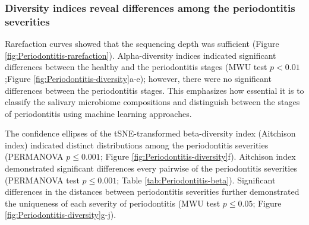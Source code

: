 \documentclass[11pt, a4paper, onecolumn, oneside]{report}
\begin{document}
            \subsubsection{Diversity indices reveal differences among the periodontitis severities}
                Rarefaction curves showed that the sequencing depth was sufficient (Figure \ref{fig:Periodontitis-rarefaction}). Alpha-diversity indices indicated significant differences between the healthy and the periodontitis stages (MWU test $p < 0.01$;Figure \ref{fig:Periodontitis-diversity}a-e); however, there were no significant differences between the periodontitis stages. This emphasizes how essential it is to classify the salivary microbiome compositions and distinguish between the stages of periodontitis using machine learning approaches.

                The confidence ellipses of the tSNE-transformed beta-diversity index (Aitchison index) indicated distinct distributions among the periodontitis severities (PERMANOVA $p \le 0.001$; Figure \ref{fig:Periodontitis-diversity}f). Aitchison index demonstrated significant differences every pairwise of the periodontitis severities (PERMANOVA test $p \le 0.001$; Table \ref{tab:Periodontitis-beta}). Significant differences in the distances between periodontitis severities further demonstrated the uniqueness of each severity of periodontitis (MWU test $p \le 0.05$; Figure \ref{fig:Periodontitis-diversity}g-j).
\end{document}
